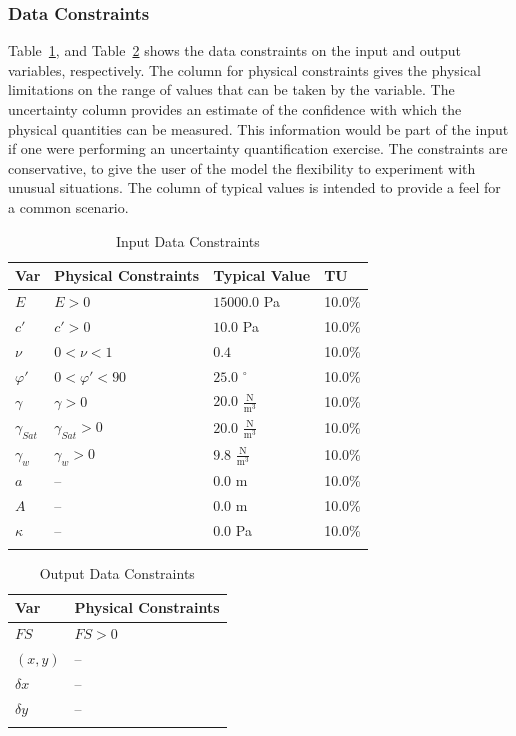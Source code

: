 \documentclass[12pt]{article}
\begin{document}
\subsubsection{Data Constraints}
\label{Sec:DataConstraints}
Table~\ref{Table:InDataConstraints}, and Table~\ref{Table:OutDataConstraints} shows the data constraints on the input and output variables, respectively. The column for physical constraints gives the physical limitations on the range of values that can be taken by the variable. The uncertainty column provides an estimate of the confidence with which the physical quantities can be measured. This information would be part of the input if one were performing an uncertainty quantification exercise. The constraints are conservative, to give the user of the model the flexibility to experiment with unusual situations. The column of typical values is intended to provide a feel for a common scenario.
\begin{longtable}{l l l l}
\toprule
Var & Physical Constraints & Typical Value & TU
\\
\midrule
$E$ & $E>0$ & $15000.0$ Pa & 10.0\%
\\
$c'$ & $c'>0$ & $10.0$ Pa & 10.0\%
\\
$ν$ & $0<ν<1$ & $0.4$ & 10.0\%
\\
$φ'$ & $0<φ'<90$ & $25.0$ ${}^{\circ}$ & 10.0\%
\\
$γ$ & $γ>0$ & $20.0$ $\frac{\text{N}}{\text{m}^{3}}$ & 10.0\%
\\
${γ_{Sat}}$ & ${γ_{Sat}}>0$ & $20.0$ $\frac{\text{N}}{\text{m}^{3}}$ & 10.0\%
\\
${γ_{w}}$ & ${γ_{w}}>0$ & $9.8$ $\frac{\text{N}}{\text{m}^{3}}$ & 10.0\%
\\
$a$ & -- & $0.0$ m & 10.0\%
\\
$A$ & -- & $0.0$ m & 10.0\%
\\
$κ$ & -- & $0.0$ Pa & 10.0\%
\\
\bottomrule
\caption{Input Data Constraints}
\label{Table:InDataConstraints}
\end{longtable}
\begin{longtable}{l l}
\toprule
Var & Physical Constraints
\\
\midrule
$FS$ & $FS>0$
\\
$(x,y)$ & --
\\
$δx$ & --
\\
$δy$ & --
\\
\bottomrule
\caption{Output Data Constraints}
\label{Table:OutDataConstraints}
\end{longtable}
\end{document}
